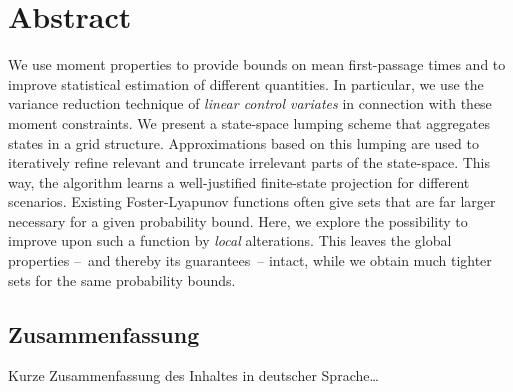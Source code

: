 
\chapter*{Abstract}
We use moment properties to provide bounds on mean first-passage times and to improve statistical estimation of different quantities.  In particular, we use the variance reduction technique of \emph{linear control variates} in connection with these moment constraints.  We present a state-space lumping scheme that aggregates states in a grid structure.  Approximations based on this lumping are used to iteratively refine relevant and truncate irrelevant parts of the state-space.  This way, the algorithm learns a well-justified finite-state projection for different scenarios.  Existing Foster-Lyapunov functions often give sets that are far larger necessary for a given probability bound.  Here, we explore the possibility to improve upon such a function by \emph{local} alterations.  This leaves the global properties --~and thereby its guarantees~-- intact, while we obtain much tighter sets for the same probability bounds.

\cleardoublepage

\begin{otherlanguage}{ngerman}
\chapter*{Zusammenfassung}
Kurze Zusammenfassung des Inhaltes in deutscher Sprache\dots
\end{otherlanguage}


\vfill
